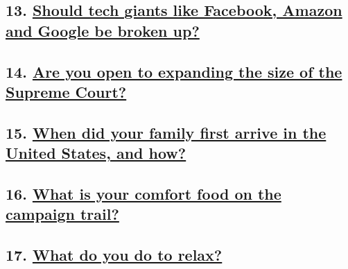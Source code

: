 \hypertarget{13-should-tech-giants-like-facebook-amazon-and-google-be-broken-up}{%
\subsection{\texorpdfstring{13.
\href{https://www.nytimes.com/interactive/2019/us/politics/big-tech-democratic-candidates.html}{Should
tech giants like Facebook, Amazon and Google be broken
up?}}{13. Should tech giants like Facebook, Amazon and Google be broken up?}}\label{13-should-tech-giants-like-facebook-amazon-and-google-be-broken-up}}

\hypertarget{14-are-you-open-to-expanding-the-size-of-the-supreme-court}{%
\subsection{\texorpdfstring{14.
\href{https://www.nytimes.com/interactive/2019/us/politics/supreme-court-democratic-candidates.html}{Are
you open to expanding the size of the Supreme
Court?}}{14. Are you open to expanding the size of the Supreme Court?}}\label{14-are-you-open-to-expanding-the-size-of-the-supreme-court}}

\hypertarget{15-when-did-your-family-first-arrive-in-the-united-states-and-how}{%
\subsection{\texorpdfstring{15.
\href{https://www.nytimes.com/interactive/2019/us/politics/family-history-democratic-candidates.html}{When
did your family first arrive in the United States, and
how?}}{15. When did your family first arrive in the United States, and how?}}\label{15-when-did-your-family-first-arrive-in-the-united-states-and-how}}

\hypertarget{16-what-is-your-comfort-food-on-the-campaign-trail}{%
\subsection{\texorpdfstring{16.
\href{https://www.nytimes.com/interactive/2019/us/politics/campaign-comfort-food-democratic-candidates.html}{What
is your comfort food on the campaign
trail?}}{16. What is your comfort food on the campaign trail?}}\label{16-what-is-your-comfort-food-on-the-campaign-trail}}

\hypertarget{17-what-do-you-do-to-relax}{%
\subsection{\texorpdfstring{17.
\href{https://www.nytimes.com/interactive/2019/us/politics/relaxation-democratic-candidates.html}{What
do you do to
relax?}}{17. What do you do to relax?}}\label{17-what-do-you-do-to-relax}}

